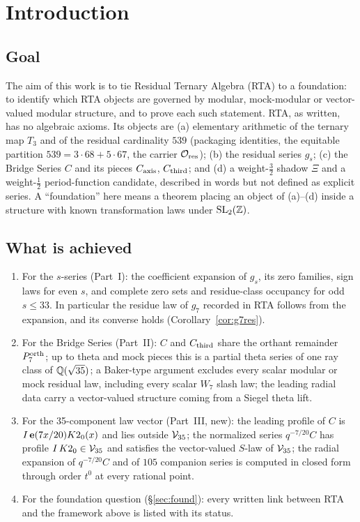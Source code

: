 \section{Introduction}\label{sec:gintro}
\subsection{Goal}
The aim of this work is to tie Residual Ternary Algebra (RTA) to a foundation: to identify which RTA objects are governed by modular,
mock-modular or vector-valued modular structure, and to prove each such statement. RTA, as written, has no algebraic axioms. Its objects are
(a) elementary arithmetic of the ternary map $T_3$ and of the residual cardinality $539$ (packaging identities, the equitable partition
$539=3\cdot68+5\cdot67$, the carrier $\mathcal O_{\rm res}$); (b) the residual series $g_s$; (c) the Bridge Series $C$ and its pieces
$C_{\mathrm{axis}}$, $C_{\mathrm{third}}$; and (d) a weight-$\tfrac32$ shadow $\Xi$ and a weight-$\tfrac12$ period-function candidate, described in words but not
defined as explicit series. A ``foundation'' here means a theorem placing an object of (a)--(d) inside a structure with known transformation
laws under $\mathrm{SL}_2(\mathbb{Z})$.

\subsection{What is achieved}
\begin{enumerate}[label=(\arabic*),leftmargin=2em]
\item For the $s$-series (Part~I): the coefficient expansion of $g_s$, its zero families, sign laws for even $s$, and complete zero sets and
residue-class occupancy for odd $s\le33$. In particular the residue law of $g_7$ recorded in RTA follows from the expansion, and its converse holds
(Corollary~\ref{cor:g7res}).
\item For the Bridge Series (Part~II): $C$ and $C_{\mathrm{third}}$ share the orthant remainder $P^{\mathrm{orth}}_7$; up to theta and mock pieces this is a partial theta series
of one ray class of $\mathbb{Q}(\sqrt{35})$; a Baker-type argument excludes every scalar modular or mock residual law, including every scalar $W_7$ slash law;
the leading radial data carry a vector-valued structure coming from a Siegel theta lift.
\item For the 35-component law vector (Part~III, new): the leading profile of $C$ is $I\,\mathbf{e}(7x/20)K2_0(x)$ and lies outside $\mathcal V_{35}$; the normalized
series $q^{-7/20}C$ has profile $I\,K2_0\in\mathcal V_{35}$ and satisfies the vector-valued $S$-law of $\mathcal V_{35}$; the radial expansion of $q^{-7/20}C$ and of
$105$ companion series is computed in closed form through order $t^{0}$ at every rational point.
\item For the foundation question (\S\ref{sec:found}): every written link between RTA and the framework above is listed with its status.
\end{enumerate}

